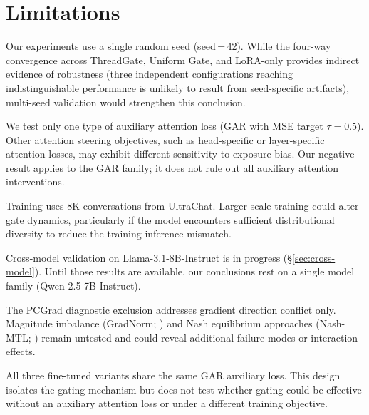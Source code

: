 \section{Limitations}\label{sec:limitations}

Our experiments use a single random seed (seed\,=\,42). While the four-way convergence across ThreadGate, Uniform Gate, and LoRA-only provides indirect evidence of robustness (three independent configurations reaching indistinguishable performance is unlikely to result from seed-specific artifacts), multi-seed validation would strengthen this conclusion.

We test only one type of auxiliary attention loss (GAR with MSE target $\tau = 0.5$). Other attention steering objectives, such as head-specific or layer-specific attention losses, may exhibit different sensitivity to exposure bias. Our negative result applies to the GAR family; it does not rule out all auxiliary attention interventions.

Training uses 8K conversations from UltraChat. Larger-scale training could alter gate dynamics, particularly if the model encounters sufficient distributional diversity to reduce the training-inference mismatch.

Cross-model validation on Llama-3.1-8B-Instruct is in progress (\S\ref{sec:cross-model}). Until those results are available, our conclusions rest on a single model family (Qwen-2.5-7B-Instruct).

The PCGrad diagnostic exclusion addresses gradient direction conflict only. Magnitude imbalance (GradNorm; \citealp{chen2018gradnorm}) and Nash equilibrium approaches (Nash-MTL; \citealp{navon2022nash}) remain untested and could reveal additional failure modes or interaction effects.

All three fine-tuned variants share the same GAR auxiliary loss. This design isolates the gating mechanism but does not test whether gating could be effective without an auxiliary attention loss or under a different training objective.
